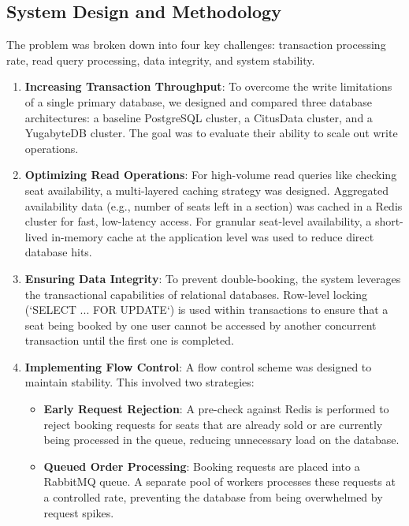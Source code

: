 \subsection{System Design and Methodology}
The problem was broken down into four key challenges: transaction processing rate, read query processing, data integrity, and system stability.

\begin{enumerate}
    \item \textbf{Increasing Transaction Throughput}: To overcome the write limitations of a single primary database, we designed and compared three database architectures: a baseline PostgreSQL cluster, a CitusData cluster, and a YugabyteDB cluster. The goal was to evaluate their ability to scale out write operations.

    \item \textbf{Optimizing Read Operations}: For high-volume read queries like checking seat availability, a multi-layered caching strategy was designed. Aggregated availability data (e.g., number of seats left in a section) was cached in a Redis cluster for fast, low-latency access. For granular seat-level availability, a short-lived in-memory cache at the application level was used to reduce direct database hits.

    \item \textbf{Ensuring Data Integrity}: To prevent double-booking, the system leverages the transactional capabilities of relational databases. Row-level locking (`SELECT ... FOR UPDATE`) is used within transactions to ensure that a seat being booked by one user cannot be accessed by another concurrent transaction until the first one is completed.

    \item \textbf{Implementing Flow Control}: A flow control scheme was designed to maintain stability. This involved two strategies:
          \begin{itemize}
              \item \textbf{Early Request Rejection}: A pre-check against Redis is performed to reject booking requests for seats that are already sold or are currently being processed in the queue, reducing unnecessary load on the database.
              \item \textbf{Queued Order Processing}: Booking requests are placed into a RabbitMQ queue. A separate pool of workers processes these requests at a controlled rate, preventing the database from being overwhelmed by request spikes.
          \end{itemize}

\end{enumerate}


